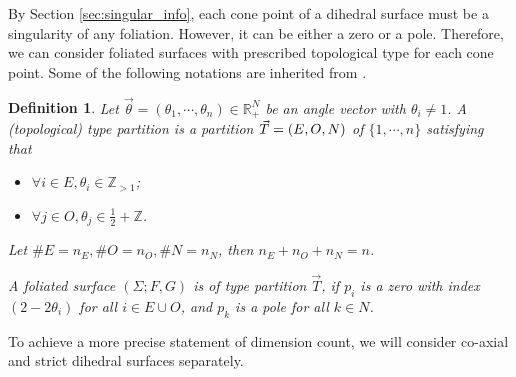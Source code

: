 \documentclass[pdflatex,sn-mathphys]{sn-jnl}%
\numberwithin{equation}{section}
\theoremstyle{thmstyleone}%
\newtheorem{definition}[theorem]{Definition}
\newcommand{\RR}{\mathbb{R}}
\newcommand{\ZZ}{\mathbb{Z}}
\newcommand{\vtheta}{\vec{\theta}}
\newcommand{\SYM}{\textcolor{black}}
\newcommand{\DEF}{\emph}
\begin{document}

\medskip
By Section \ref{sec:singular_info}, each cone point of a dihedral surface must be a singularity of any foliation. However, it can be either a zero or a pole. Therefore, we can consider foliated surfaces with prescribed topological type for each cone point. Some of the following notations are inherited from \cite{GT23}.

\begin{definition}
    Let $\vec{\theta}=(\theta_1, \cdots, \theta_n) \in \RR_+^N$ be an angle vector with $\theta_i\neq 1$. A \DEF{(topological) type partition} is a partition $\SYM{\vec{T}}=( E, O, N )$ of $\{1,\cdots,n\}$ satisfying that
\begin{itemize}
    \item $\forall i\in E, \theta_{i}\in \ZZ_{>1}$;
    \item $\forall j\in O, \theta_{j}\in \frac12 + \ZZ$.
\end{itemize}
    Let $ \#E=n_E, \#O=n_O, \#N=n_N $, then $n_E + n_O + n_N = n$.

    A foliated surface $(\Sigma;F,G)$ is \DEF{of type partition $\vec{T}$}, if $p_i$ is a zero with index $(2-2\theta_i)$ for all $i \in E \cup O$, and $p_k$ is a pole for all $k \in N$.
\end{definition}

To achieve a more precise statement of dimension count, we will consider co-axial and strict dihedral surfaces separately.
\end{document}
